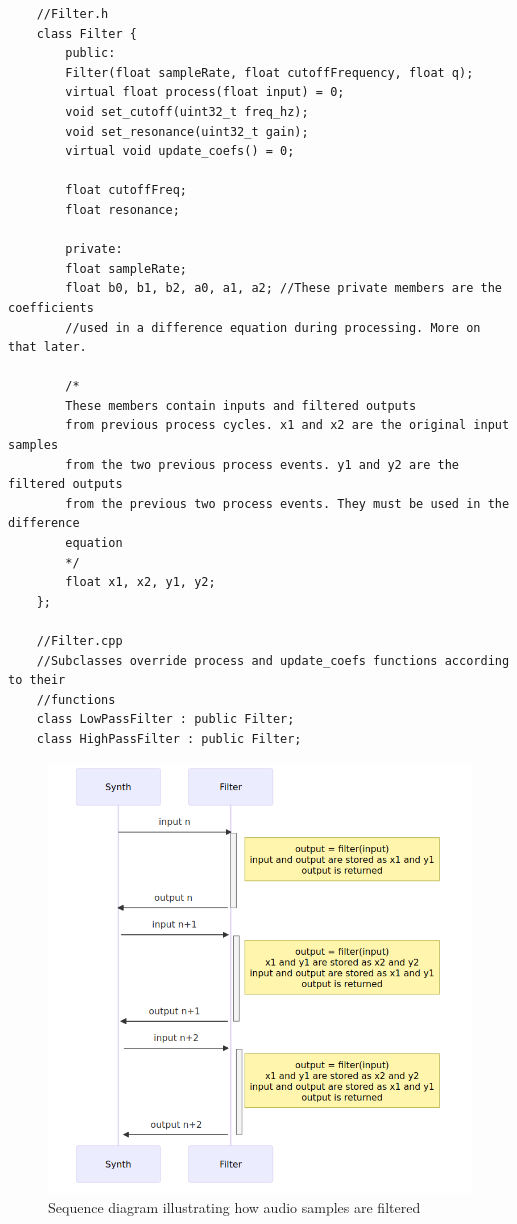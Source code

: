 \documentclass[acmlarge,screen]{acmart}
\begin{document}
	\begin{verbatim}
	//Filter.h
	class Filter {
		public:
		Filter(float sampleRate, float cutoffFrequency, float q);
		virtual float process(float input) = 0;
		void set_cutoff(uint32_t freq_hz);
		void set_resonance(uint32_t gain);
		virtual void update_coefs() = 0;
		
		float cutoffFreq;
		float resonance;
		
		private:
		float sampleRate;
		float b0, b1, b2, a0, a1, a2; //These private members are the coefficients
		//used in a difference equation during processing. More on that later.
		
		/*
		These members contain inputs and filtered outputs
		from previous process cycles. x1 and x2 are the original input samples
		from the two previous process events. y1 and y2 are the filtered outputs
		from the previous two process events. They must be used in the difference
		equation
		*/
		float x1, x2, y1, y2;
	};
	
	//Filter.cpp
	//Subclasses override process and update_coefs functions according to their
	//functions
	class LowPassFilter : public Filter;
	class HighPassFilter : public Filter;
	\end{verbatim}
	
	\clearpage

	\begin{figure}
		\centering
		\includegraphics[width=\linewidth]{filter_sequence_diagram}
		\caption{Sequence diagram illustrating how audio samples are filtered}
	\end{figure}
\end{document}
